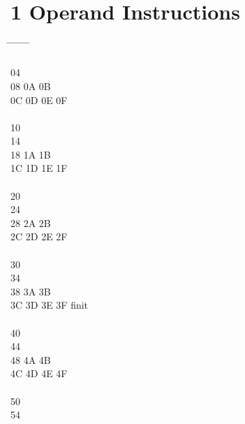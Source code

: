 \documentclass[letterpaper,10pt,openright,twoside,onecolumn]{book}
\begin{document}
\newpage\section{1 Operand Instructions}
  \begin{tabbing}
    \makebox[\ncol]{00\hfill} \= 	\=
    \makebox[\ncol]{01\hfill} \= 	\=
    \makebox[\ncol]{02\hfill} \= 	\=
    \makebox[\ncol]{03\hfill} \= 	\\
    \\
    04 \> 	 \> 	 \> 	 \> 	\\
    08 \> 	 \> 	\> 0A \> 	\> 0B \> 	\\
    0C \> 	\> 0D \> 	\> 0E \> 	\> 0F \> 	\\
    \\
    10 \> 	 \> 	 \> 	 \> 	\\
    14 \> 	 \> 	 \> 	 \> 	\\
    18 \> 	 \> 	\> 1A \> 	\> 1B \> 	\\
    1C \> 	\> 1D \> 	\> 1E \> 	\> 1F \> 	\\
    \\
    20 \> 	 \> 	 \> 	 \> 	\\
    24 \> 	 \> 	 \> 	 \> 	\\
    28 \> 	 \> 	\> 2A \> 	\> 2B \> 	\\
    2C \> 	\> 2D \> 	\> 2E \> 	\> 2F \> 	\\
    \\
    30 \> 	 \> 	 \> 	 \> 	\\
    34 \> 	 \> 	 \> 	 \> 	\\
    38 \> 	 \> 	\> 3A \> 	\> 3B \> 	\\
    3C \> 	\> 3D \> 	\> 3E \> 	\> 3F \> finit	\\
    \\
    40 \> 	 \> 	 \> 	 \> 	\\
    44 \> 	 \> 	 \> 	 \> 	\\
    48 \> 	 \> 	\> 4A \> 	\> 4B \> 	\\
    4C \> 	\> 4D \> 	\> 4E \> 	\> 4F \> 	\\
    \\
    50 \> 	 \> 	 \> 	 \> 	\\
    54 \> 	 \> 	 \> 	 \> 	\\

\end{tabbing}
\end{document}

